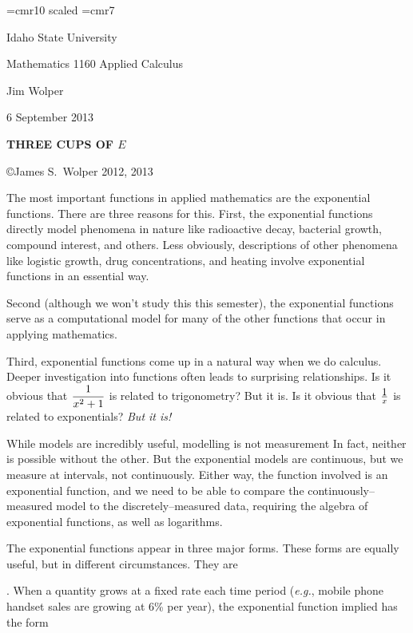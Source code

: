 

\font\bigger=cmr10 scaled
\font\smaller=cmr7
\def\Tau{\rm T}

\centerline{Idaho State University}
\centerline{Mathematics 1160 Applied Calculus}
\centerline{Jim Wolper}
\centerline{6 September 2013}
\centerline{{\bf THREE CUPS OF $E$}}
\centerline{\copyright James S.~Wolper 2012, 2013}


The most important functions in applied mathematics are the
exponential functions.  There are three reasons for this.  First,
the exponential functions directly model phenomena in nature like
radioactive decay, bacterial growth, compound interest, and others.
Less obviously, descriptions of other phenomena like logistic
growth, drug concentrations, and heating involve exponential
functions in an essential way.  

Second (although we won't study this this semester), the
exponential functions serve as a computational model for many of the other
functions that occur in applying mathematics.

Third, exponential functions come up in a natural way when
we do calculus.  Deeper investigation into functions
often leads to surprising relationships.  Is it obvious that
$\displaystyle {1\over{x^2 + 1}}$ is related to trigonometry?
But it is.  Is it obvious that $\displaystyle 1\over x$ is 
related to exponentials?  {\sl But it is!\/}

While models are incredibly useful, modelling is not measurement
In fact, neither is possible without the
other.  But the exponential models are continuous, but we measure
at intervals, not continuously.  Either way, the function involved is
an exponential function, and we need to be 
able to compare the continuously--measured
model to the discretely--measured data, requiring the algebra of
exponential functions, as well as logarithms.


The exponential functions appear in three major forms.  These
forms are equally useful, but in different circumstances.  They are

.  When a quantity grows at a fixed
rate each time period ({\it e.g.\/}, mobile phone handset sales are
growing at 6\% per year), the exponential function implied
has the form

